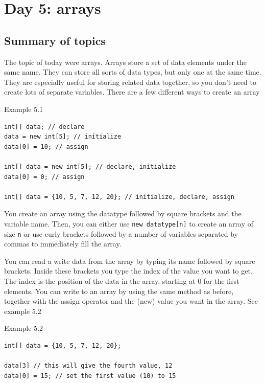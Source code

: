 \chapter{Day 5: arrays}

\section{Summary of topics}

The topic of today were arrays. Arrays store a set of data elements under the same name. They can store all sorts of data types, but only one at the same time. They are especially useful for storing related data together, so you don't need to create lots of separate variables. There are a few different ways to create an array

\begin{codebox}{Example 5.1}
    \begin{lstlisting}
int[] data; // declare
data = new int[5]; // initialize 
data[0] = 10; // assign

int[] data = new int[5]; // declare, initialize
data[0] = 0; // assign

int[] data = {10, 5, 7, 12, 20}; // initialize, declare, assign
    \end{lstlisting}
\end{codebox}

You create an array using the datatype followed by square brackets and the variable name. Then, you can either use \texttt{new datatype[n]} to create an array of size \texttt{n} or use curly brackets followed by a number of variables separated by commas to immediately fill the array.

You can read a write data from the array by typing its name followed by square brackets. Inside these brackets you type the index of the value you want to get. The index is the position of the data in the array, starting at 0 for the first elements. You can write to an array by using the same method as before, together with the assign operator and the (new) value you want in the array. See example 5.2

\begin{codebox}{Example 5.2}
    \begin{lstlisting}
int[] data = {10, 5, 7, 12, 20};

data[3] // this will give the fourth value, 12
data[0] = 15; // set the first value (10) to 15
    \end{lstlisting}
\end{codebox}

